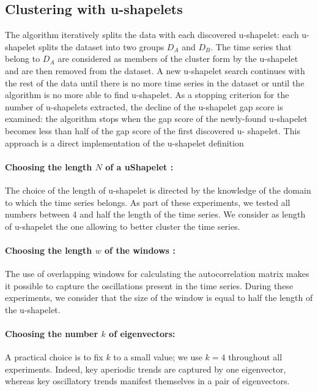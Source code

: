 \subsection{Clustering with u-shapelets}
The algorithm iteratively splits the data with each discovered u-shapelet: each u-shapelet splits the dataset into two groups $D_A$ and $D_B$. The time series that belong to $D_A$ are considered as members of the cluster form by the u-shapelet and are then removed from the dataset. A new u-shapelet search continues with the rest of the data until there is no more time series in the dataset or until the algorithm is no more able to find u-shapelet. As a stopping
criterion for the number of u-shapelets extracted, the decline of the u-shapelet gap score is
examined: the algorithm stops when the gap score of the newly-found u-shapelet
becomes less than half of the gap score of the first discovered u- shapelet. This approach is a direct implementation of the u-shapelet definition

\paragraph{Choosing the length $N$ of a uShapelet : }
The choice of the length of u-shapelet is directed by the knowledge of the
domain to which the time series belongs. As part of these experiments, we tested all  numbers between 4 and half the length of the time series. We consider as length of u-shapelet the one allowing to better cluster the time series.

\paragraph{Choosing the length $w$ of the windows : }
The use of overlapping windows for calculating the autocorrelation matrix makes
it possible to capture the oscillations present in the time series. During these experiments, we consider that the size of the window is equal to half the length of the u-shapelet.
  
\paragraph{Choosing  the number $k$ of eigenvectors: }
A practical choice is to fix $k$ to a small value; we use $k = 4$ throughout all
experiments. Indeed, key aperiodic trends are captured by one eigenvector,
whereas key oscillatory trends manifest themselves in a pair of eigenvectors.  


